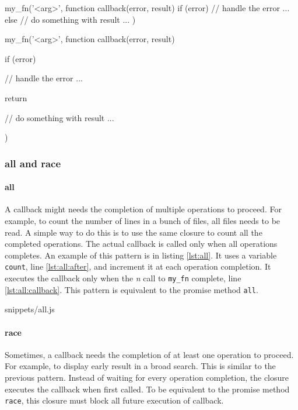 \begin{code}[js, %
             caption={A conditional switch to handle errors}, %
             label={lst:err-cond}] %
my_fn('<arg>', function callback(error, result) {
  if (error) {
    // handle the error ...
  } else {
    // do something with result ...
  }
})
\end{code}

\begin{code}[js, %
             caption={An early return to handle errors}, %
             label={lst:err-return}] %
my_fn('<arg>', function callback(error, result) {
  if (error) {
    // handle the error ...

    return
  }
  
  // do something with result ...
})
\end{code}

\subsubsection{all and race} \label{section:all-race}

\paragraph{all}

A callback might needs the completion of multiple operations to proceed.
For example, to count the number of lines in a bunch of files, all files needs to be read.
A simple way to do this is to use the same closure to count all the completed operations.
The actual callback is called only when all operations completes.
An example of this pattern is in listing \ref{lst:all}.
It uses a variable \texttt{count}, line \ref{lst:all:after}, and increment it at each operation completion.
It executes the callback only when the \textit{n} call to \texttt{my_fn} complete, line \ref{lst:all:callback}.
This pattern is equivalent to the promise method \texttt{all}.

             {snippets/all.js}

\paragraph{race}

Sometimes, a callback needs the completion of at least one operation to proceed.
For example, to display early result in a broad search.
This is similar to the previous pattern.
Instead of waiting for every operation completion, the closure executes the callback when first called.
To be equivalent to the promise method \texttt{race}, this closure must block all future execution of callback.


